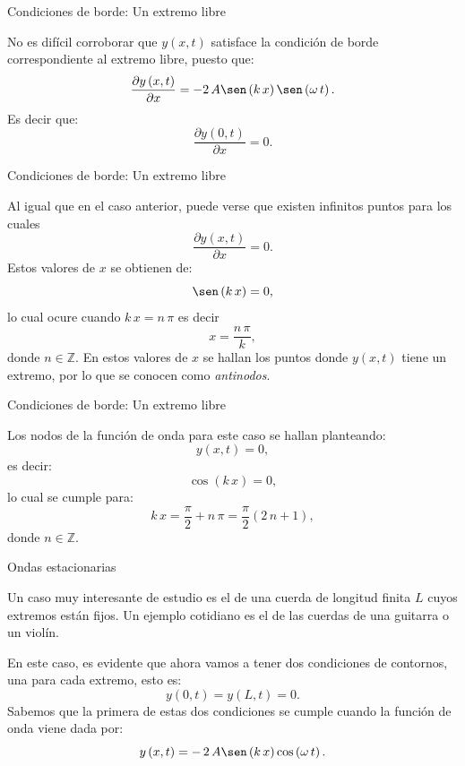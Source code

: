 \documentclass[11pt,handout,aspectratio=1610]{beamer}
\newcommand{\pdiff}[2]{\frac{\partial #1}{\partial #2}}
\newcommand{\zz}{\mathbb{Z}}
\newcommand{\vs}{\vspace{11pt}}
\begin{document}
\begin{frame}{Condiciones de borde: Un extremo libre}

    No es difícil corroborar que $ y \left(x,t\right) $ satisface la condición de borde correspondiente al extremo libre, puesto que: $$ \pdiff{y \left(x,t\right)}{x} = - 2 \, A \sen \left(k \, x\right) \sen \left(\omega \, t\right).  $$ Es decir que: $$ \pdiff{y \left(0,t\right)}{x} = 0. $$ 
        
\end{frame}

\begin{frame}{Condiciones de borde: Un extremo libre}

    Al igual que en el caso anterior, puede verse que existen infinitos puntos para los cuales $$ \pdiff{y \left(x,t\right)}{x} = 0. $$ Estos valores de $x$ se obtienen de: $$ \sen \left(k \, x\right) = 0, $$ lo cual ocure cuando $ k \, x = n \, \pi $ es decir $$ x = \frac{n \, \pi}{k}, $$ donde $n \in \zz $. En estos valores de $x$ se hallan los puntos donde $ y \left(x,t\right) $ tiene un extremo, por lo que se conocen como \emph{antinodos}.
        
\end{frame}

\begin{frame}{Condiciones de borde: Un extremo libre}

    Los nodos de la función de onda para este caso se hallan planteando: $$ y \left(x,t\right) = 0, $$ es decir: $$ \cos \left(k \, x\right) = 0, $$ lo cual se cumple para: $$ k \, x = \frac{\pi}{2} + n \, \pi = \frac{\pi}{2} \left( 2 \, n + 1\right), $$ donde $n \in \zz $.

\end{frame}

\begin{frame}{Ondas estacionarias}

    Un caso muy interesante de estudio es el de una cuerda de longitud finita $L$ cuyos extremos están fijos. Un ejemplo cotidiano es el de las cuerdas de una guitarra o un violín.

    \vs 

    En este caso, es evidente que ahora vamos a tener dos condiciones de contornos, una para cada extremo, esto es: $$ y \left(0,t\right) = y \left(L,t\right) = 0. $$ Sabemos que la primera de estas dos condiciones se cumple cuando la función de onda viene dada por: $$ y \left(x,t\right) = - \, 2 \, A \sen \left(k \, x\right) \cos \left(\omega \, t\right). $$ 
 
\end{frame}
\end{document}
